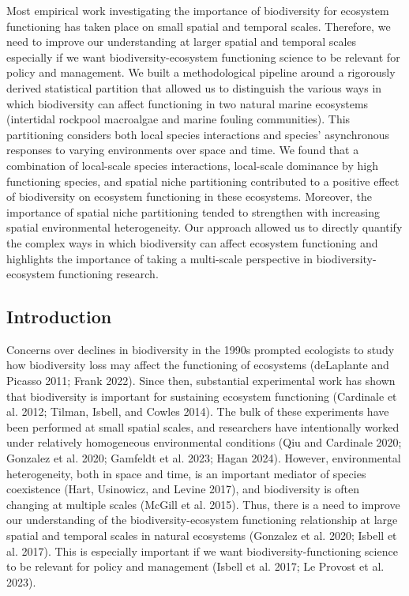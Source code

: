 \documentclass[
  letterpaper,
  DIV=11,
  numbers=noendperiod]{scrartcl}
\begin{document}
Most empirical work investigating the importance of biodiversity for
ecosystem functioning has taken place on small spatial and temporal
scales. Therefore, we need to improve our understanding at larger
spatial and temporal scales especially if we want biodiversity-ecosystem
functioning science to be relevant for policy and management. We built a
methodological pipeline around a rigorously derived statistical
partition that allowed us to distinguish the various ways in which
biodiversity can affect functioning in two natural marine ecosystems
(intertidal rockpool macroalgae and marine fouling communities). This
partitioning considers both local species interactions and species'
asynchronous responses to varying environments over space and time. We
found that a combination of local-scale species interactions,
local-scale dominance by high functioning species, and spatial niche
partitioning contributed to a positive effect of biodiversity on
ecosystem functioning in these ecosystems. Moreover, the importance of
spatial niche partitioning tended to strengthen with increasing spatial
environmental heterogeneity. Our approach allowed us to directly
quantify the complex ways in which biodiversity can affect ecosystem
functioning and highlights the importance of taking a multi-scale
perspective in biodiversity-ecosystem functioning research.

\subsection{Introduction}\label{introduction}

Concerns over declines in biodiversity in the 1990s prompted ecologists
to study how biodiversity loss may affect the functioning of ecosystems
(deLaplante and Picasso 2011; Frank 2022). Since then, substantial
experimental work has shown that biodiversity is important for
sustaining ecosystem functioning (Cardinale et al. 2012; Tilman, Isbell,
and Cowles 2014). The bulk of these experiments have been performed at
small spatial scales, and researchers have intentionally worked under
relatively homogeneous environmental conditions (Qiu and Cardinale 2020;
Gonzalez et al. 2020; Gamfeldt et al. 2023; Hagan 2024). However,
environmental heterogeneity, both in space and time, is an important
mediator of species coexistence (Hart, Usinowicz, and Levine 2017), and
biodiversity is often changing at multiple scales (McGill et al. 2015).
Thus, there is a need to improve our understanding of the
biodiversity-ecosystem functioning relationship at large spatial and
temporal scales in natural ecosystems (Gonzalez et al. 2020; Isbell et
al. 2017). This is especially important if we want
biodiversity-functioning science to be relevant for policy and
management (Isbell et al. 2017; Le Provost et al. 2023).
\end{document}
